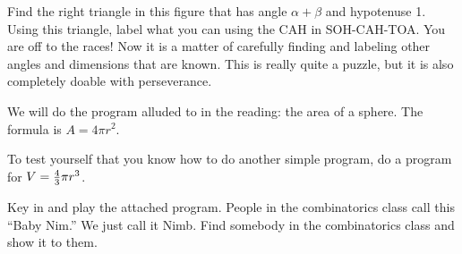 \noindent Find the right triangle in this figure that has angle $\alpha + \beta$ and hypotenuse 1. Using this triangle, label what you can using the CAH in SOH-CAH-TOA. You are off to the races! Now it is a matter of
carefully finding and labeling other angles and dimensions that are known. This is really quite a puzzle, but it is also completely doable with perseverance.

\bigskip

\nobreak\bigskip

\noindent We will do the program alluded to in the reading: the area of a sphere. The formula is $A = 4 \pi r^2$.
\bigskip

\nobreak\bigskip

\noindent To test yourself that you know how to do another simple program, do a program for $V = {4\over 3} \pi r^3$.

\bigskip

\nobreak\bigskip

\noindent Key in and play the attached program. People in the combinatorics class call this ``Baby Nim.'' We just call it Nimb. Find somebody in the combinatorics class and show it to them.

\bye
